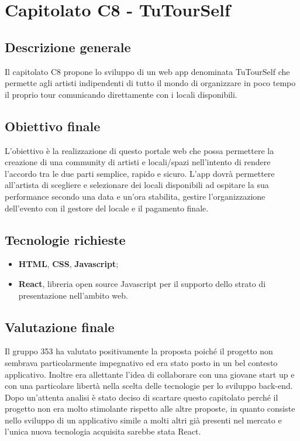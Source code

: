 \documentclass[main.tex]{subfiles}
\begin{document}
\chapter{Capitolato C8 - TuTourSelf}
\section{Descrizione generale}
Il capitolato C8 propone lo sviluppo di un web app denominata TuTourSelf che permette agli artisti indipendenti di tutto il mondo di organizzare in poco tempo il proprio tour comunicando direttamente con i locali disponibili.
\section{Obiettivo finale}
L’obiettivo è la realizzazione di questo portale web che possa permettere la creazione di una community di artisti e locali/spazi nell’intento di rendere l’accordo tra le due parti semplice, rapido e sicuro. L’app dovrà permettere all’artista di scegliere e selezionare dei locali disponibili ad ospitare la sua performance secondo una data e un’ora stabilita, gestire l’organizzazione dell’evento con il gestore del locale e il pagamento finale.
\section{Tecnologie richieste}
\begin{itemize}
	\item \textbf{HTML}, \textbf{CSS}, \textbf{Javascript};
	\item \textbf{React}, libreria open source Javascript per il supporto dello strato di presentazione nell'ambito web.
\end{itemize}
\section{Valutazione finale}
Il gruppo 353 ha valutato positivamente la proposta poiché il progetto non sembrava particolarmente impegnativo ed era stato posto in un bel contesto applicativo. Inoltre era allettante l’idea di collaborare con una giovane start up e con una particolare libertà nella scelta delle tecnologie per lo sviluppo back-end.\\
Dopo un’attenta analisi è stato deciso di scartare questo capitolato perché il progetto non era molto stimolante rispetto alle altre proposte, in quanto consiste nello sviluppo di un applicativo simile a molti altri già presenti nel mercato e l’unica nuova tecnologia acquisita sarebbe stata React.
\end{document}
